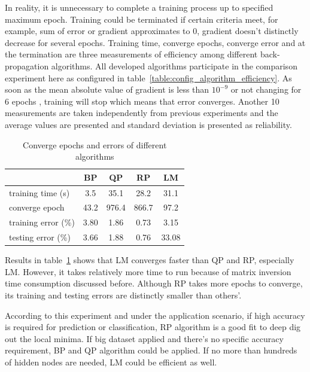 \documentclass[procedia]{easychair}
\begin{document}
In reality, it is unnecessary to complete a training process up to specified maximum epoch.  Training could be terminated if certain criteria meet, for example, sum of error or gradient approximates to 0, gradient doesn’t distinctly decrease for several epochs.  Training time, converge epochs, converge error and at the termination are three measurements of efficiency among different back-propagation algorithms.  All developed algorithms participate in the comparison experiment here as configured in table~\ref{table:config_algorithm_efficiency}.  As soon as the mean absolute value of gradient is less than $10 ^ {-9}$ or not changing for 6 epochs \cite{matlab:neural_networks}, training will stop which means that error converges.  Another 10 measurements are taken independently from previous experiments and the average values are presented and standard deviation is presented as reliability.

\begin{table}[htp]
    \centering
    \caption{Converge epochs and errors of different algorithms}
    \begin{tabular}{ l c c c c }
        \hline \hline
        & BP & QP & RP & LM \\
        \hline
        training time (s) & 3.5 & 35.1 & 28.2 & 31.1 \\
        converge epoch & 43.2 & 976.4 & 866.7 & 97.2 \\
        training error (\%) & 3.80 & 1.86 & 0.73 & 3.15 \\
        testing error (\%) & 3.66 & 1.88 & 0.76 & 33.08 \\
        \hline \hline
    \end{tabular}
    \label{table:algorithm_efficiency}
\end{table}

Results in table~\ref{table:algorithm_efficiency} shows that LM converges faster than QP and RP, especially LM.  However, it takes relatively more time to run because of matrix inversion time consumption discussed before.  Although RP takes more epochs to converge, its training and testing errors are distinctly smaller than others’.

According to this experiment and under the application scenario, if high accuracy is required for prediction or classification, RP algorithm is a good fit to deep dig out the local minima.  If big dataset applied and there’s no specific accuracy requirement, BP and QP algorithm could be applied.  If no more than hundreds of hidden nodes are needed, LM could be efficient as well.
\end{document}
